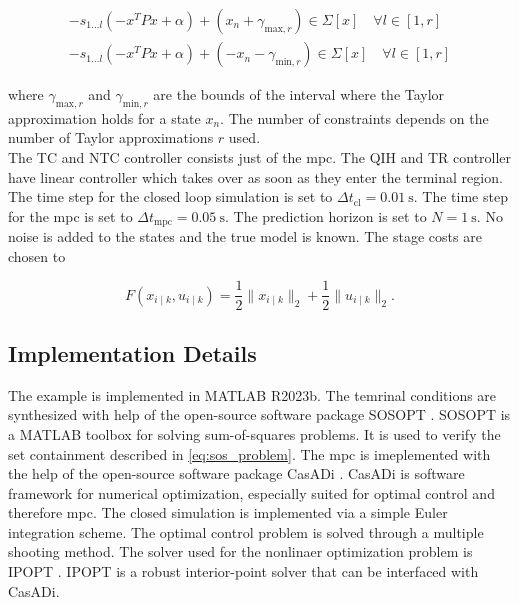 \documentclass[10pt,a4paper,titlepage]{article}
\begin{document}
\begin{align}
	-s_{1 \dots l}(-x^TPx + \alpha) + (x_{n} + \gamma_{\text{max},r}) \in \Sigma[x] \quad \forall l \in [1,r] \\
	-s_{1 \dots l}(-x^TPx + \alpha) + (-x_{n} - \gamma_{\text{min},r}) \in \Sigma[x] \quad \forall l \in [1,r]
\end{align}

where $\gamma_{\text{max},r}$ and $\gamma_{\text{min},r}$ are the bounds of the interval where the Taylor approximation holds for a state $x_n$.
The number of constraints depends on the number of Taylor approximations $r$ used.\\

The TC and NTC controller consists just of the \gls{mpc}. The QIH and TR controller have linear controller which takes over as soon as they enter the terminal region.
The time step for the closed loop simulation is set to $\Delta t_{\text{cl}} = \SI{0.01}{\second}$.  The time step for the \gls{mpc} is set to
$\Delta t_{\text{mpc}} = \SI{0.05}{\second}$. The prediction horizon is set to $N = \SI{1}{\second}$. No noise is added to the states and the true
model is known. The stage costs are chosen to

\begin{equation}
	F\left(x_{i \mid k}, u_{i \mid k}\right) = \frac{1}{2} \lVert x_{i \mid k} \rVert_2 + \frac{1}{2} \lVert u_{i \mid k} \rVert_2.
\end{equation}

\subsection{Implementation Details}
The example is implemented in MATLAB R2023b.  The temrinal conditions are synthesized with help of the open-source software package
SOSOPT \cite{seiler2013sosopt}. SOSOPT is a MATLAB toolbox for solving sum-of-squares problems. It is used to verify the set containment
described in \eqref{eq:sos_problem}. The \gls{mpc} is imeplemented with the help of the open-source software package CasADi \cite{Andersson2019}.
CasADi is software framework for numerical optimization, especially suited for optimal control and therefore \gls{mpc}. The closed simulation is implemented
via a simple Euler integration scheme. The optimal control problem is solved through a multiple shooting method. The solver used for the nonlinaer 
optimization problem is IPOPT \cite{Wächter2006}. IPOPT is a robust interior-point solver that can be interfaced with CasADi.
\end{document}
